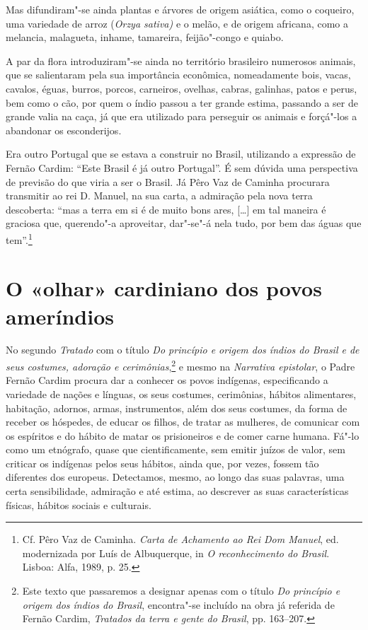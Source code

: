 Mas difundiram"-se ainda plantas e árvores de origem asiática, como o
coqueiro, uma variedade de arroz (\textit{Orzya sativa)} e o melão, e de
origem africana, como a melancia, malagueta, inhame, tamareira,
feijão"-congo e quiabo.

A par da flora introduziram"-se ainda no território brasileiro
numerosos animais, que se salientaram pela sua importância econômica,
nomeadamente bois, vacas, cavalos, éguas, burros, porcos, carneiros,
ovelhas, cabras, galinhas, patos e perus, bem como o cão, por quem o
índio passou a ter grande estima, passando a ser de grande valia na
caça, já que era utilizado para perseguir os animais e forçá"-los a
abandonar os esconderijos.

Era outro Portugal que se estava a construir no Brasil, utilizando a
expressão de Fernão Cardim: ``Este Brasil é já outro Portugal''. 
É sem dúvida uma perspectiva de previsão do que viria a ser o Brasil.
Já Pêro Vaz de Caminha procurara transmitir ao rei D. Manuel, na sua
carta, a admiração pela nova terra descoberta: ``mas a
terra em si é de muito bons ares, [\ldots{}] em tal maneira é graciosa que,
querendo"-a aproveitar, dar"-se"-á nela tudo, por bem das águas que
tem''.\footnote{ Cf. Pêro Vaz de Caminha. \textit{Carta de
Achamento ao Rei Dom Manuel}, ed. modernizada por Luís de Albuquerque,
in \textit{O reconhecimento do Brasil}. Lisboa: Alfa, 1989, p. 25.} 

\section{O «olhar» cardiniano dos povos ameríndios} 

 No segundo \textit{Tratado} com o título \textit{Do
princípio e origem dos índios do Brasil e de seus costumes, adoração e
cerimônias},\footnote{ Este texto que passaremos a designar apenas
com o título \textit{Do princípio e origem dos índios do Brasil}, 
encontra"-se incluído na obra já referida de Fernão Cardim,
\textit{Tratados da terra e gente do Brasil}, pp. 163--207.} e mesmo na
\textit{Narrativa epistolar}, o Padre Fernão Cardim procura dar a
conhecer os povos indígenas, especificando a variedade de nações e
línguas, os seus costumes, cerimônias, hábitos alimentares, habitação,
adornos, armas, instrumentos, além dos seus costumes, da forma
de receber os hóspedes, de educar os filhos, de tratar as mulheres, de
comunicar com os espíritos e do hábito de matar os prisioneiros e de
comer carne humana. Fá"-lo como um etnógrafo, quase que
cientificamente, sem emitir juízos de valor, sem criticar os indígenas
pelos seus hábitos, ainda que, por vezes, fossem tão diferentes dos
europeus. Detectamos, mesmo, ao longo das suas palavras, uma certa
sensibilidade, admiração e até estima, ao descrever as suas
características físicas, hábitos sociais e culturais.

